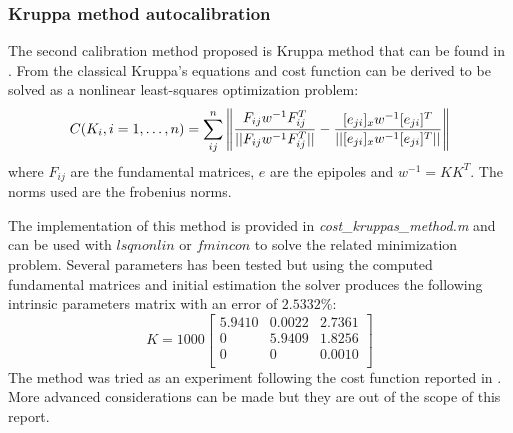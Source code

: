 \documentclass[11pt]{article}
\begin{document}
\subsubsection{Kruppa method autocalibration}
The second calibration method proposed is Kruppa method that can be found in \cite{Prapitasari14} \cite{Pollefeys}. From the classical Kruppa's equations and cost function can be derived to be solved as a nonlinear least-squares optimization problem:
\begin{equation}
    C(K_i, i = 1,\dots, n) = \sum_{ij}^{n} \norm{\frac{F_{ij}w^{-1}F_{ij}^T}{||F_{ij}w^{-1}F_{ij}^T||} - \frac{[e_{ji}]_xw^{-1}[e_{ji}]^T}{||[e_{ji}]_xw^{-1}[e_{ji}]^T||}}
\end{equation}
where $F_{ij}$ are the fundamental matrices, $e$ are the epipoles and $w^{-1} = KK^T$. The norms used are the frobenius norms.

\bigskip
The implementation of this method is provided in \textit{cost\_kruppas\_method.m} and can be used with $lsqnonlin$ or $fmincon$ to solve the related minimization problem. Several parameters has been tested but using the computed fundamental matrices and initial estimation the solver produces the following intrinsic parameters matrix with an error of $2.5332\%$:
    \begin{equation}
        K = 1000 \begin{bmatrix}
     
     5.9410  &  0.0022   & 2.7361\\
          0  &  5.9409   & 1.8256\\
          0  &       0   & 0.0010\\
\end{bmatrix}
\end{equation}
The method was tried as an experiment following the cost function reported in \cite{Pollefeys}. More advanced considerations can be made but they are out of the scope of this report. 
\newpage
\end{document}
